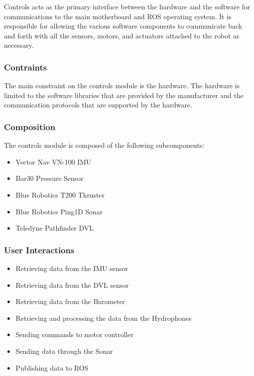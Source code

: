 Controls acts as the primary interface between the hardware and the software
for communications to the main motherboard and ROS operating system. It is
responsible for allowing the various software components to communicate back
and forth with all the sensors, motors, and actuators attached to the robot as
necessary.
\par

\subsubsection{Contraints}
\label{sec:constraints}

The main constraint on the controls module is the hardware. The hardware is 
limited to the software libraries that are provided by the manufacturer and the
communication protocols that are supported by the hardware.

\subsubsection{Composition}
\label{sec:control_composition}

The controls module is composed of the following subcomponents:
\begin{itemize}
    \item Vector Nav VN-100 IMU
    \item Bar30 Pressure Sensor
    \item Blue Robotics T200 Thruster
    \item Blue Robotics Ping1D Sonar
    \item Teledyne Pathfinder DVL
\end{itemize}

\subsubsection{User Interactions}
\label{sec:interactions}

\begin{itemize}
    \item Retrieving data from the IMU sensor 
    \item Retrieving data from the DVL sensor  
    \item Retrieving data from the Barometer 
    \item Retrieving and processing the data from the Hydrophones 
    \item Sending commands to motor controller 
    \item Sending data through the Sonar 
    \item Publishing data to ROS
\end{itemize}

